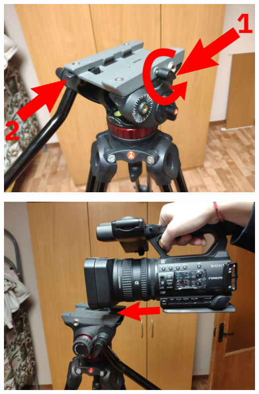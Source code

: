 \begin{enumerate}
        \begin{minipage}[c]{0.31\textwidth}\label{fig:retainer}
          \includegraphics[width=\textwidth]{Images/PortableCamera/tripod/step3-1-retainer.jpg}
        \end{minipage}
        \hfill
        \begin{minipage}[c]{0.31\textwidth}
          \includegraphics[width=\textwidth]{Images/PortableCamera/tripod/step3-2-camera-direction.jpg}
        \end{minipage}
        \hfill
        \begin{minipage}[c]{0.31\textwidth}

\end{minipage}
\end{enumerate}
